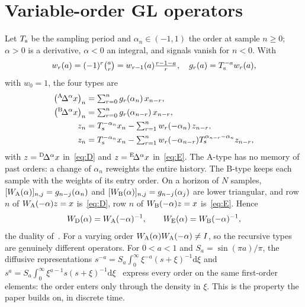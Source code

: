 \section{Variable-order GL operators}\label{sec:prelim}

Let $T_{\mathrm{s}}$ be the sampling period and $\alpha_n\in(-1,1)$ the order at sample $n\ge0$; $\alpha>0$ is a derivative, $\alpha<0$ an integral, and signals vanish for $n<0$. With
\begin{equation}
w_r(a)=(-1)^r\tbinom{a}{r}=w_{r-1}(a)\tfrac{r-1-a}{r},\quad g_r(a)=T_{\mathrm{s}}^{-a}w_r(a),\label{eq:glw}
\end{equation}
with $w_0=1$, the four types are~\cite{sierociuk2015amm,sierociuk2015cssp,sierociuk2020}
\begin{align}
\big({}^{\mathrm{A}}\!\Delta^{\alpha}x\big)_n &= \textstyle\sum_{r=0}^{n} g_r(\alpha_n)\,x_{n-r}, \label{eq:A}\\
\big({}^{\mathrm{B}}\!\Delta^{\alpha}x\big)_n &= \textstyle\sum_{r=0}^{n} g_r(\alpha_{n-r})\,x_{n-r}, \label{eq:B}\\
z_n &= T_{\mathrm{s}}^{-\alpha_n}x_n-\textstyle\sum_{r=1}^{n} w_r(-\alpha_n)\,z_{n-r}, \label{eq:D}\\
z_n &= T_{\mathrm{s}}^{-\alpha_n}x_n-\textstyle\sum_{r=1}^{n} w_r(-\alpha_{n-r})T_{\mathrm{s}}^{\alpha_{n-r}-\alpha_n}z_{n-r}, \label{eq:E}
\end{align}
with $z={}^{\mathrm{D}}\!\Delta^{\alpha}x$ in~\eqref{eq:D} and $z={}^{\mathrm{E}}\!\Delta^{\alpha}x$ in~\eqref{eq:E}.
The A-type has no memory of past orders: a change of $\alpha_n$ reweights the entire history. The B-type keeps each sample with the weights of its entry order. On a horizon of $N$ samples, $[W_{\mathrm A}(\alpha)]_{n,j}=g_{n-j}(\alpha_n)$ and $[W_{\mathrm B}(\alpha)]_{n,j}=g_{n-j}(\alpha_j)$ are lower triangular, and row $n$ of $W_{\mathrm A}(-\alpha)z=x$ is~\eqref{eq:D}, row $n$ of $W_{\mathrm B}(-\alpha)z=x$ is~\eqref{eq:E}. Hence
\begin{equation}
W_{\mathrm D}(\alpha)=W_{\mathrm A}(-\alpha)^{-1},\qquad W_{\mathrm E}(\alpha)=W_{\mathrm B}(-\alpha)^{-1},\label{eq:duality}
\end{equation}
the duality of~\cite{sierociuk2015cssp,sierociuk2016cssp,sierociuk2020}. For a varying order $W_{\mathrm A}(\alpha)W_{\mathrm A}(-\alpha)\neq I$, so the recursive types are genuinely different operators. For $0<a<1$ and $S_a=\sin(\pi a)/\pi$, the diffusive representations $s^{-a}=S_a\int_0^\infty\xi^{-a}(s+\xi)^{-1}\mathrm d\xi$ and $s^{a}=S_a\int_0^\infty\xi^{a-1}s(s+\xi)^{-1}\mathrm d\xi$~\cite{montseny1998,diethelm2023} express every order on the same first-order elements: the order enters only through the density in $\xi$. This is the property the paper builds on, in discrete time.

